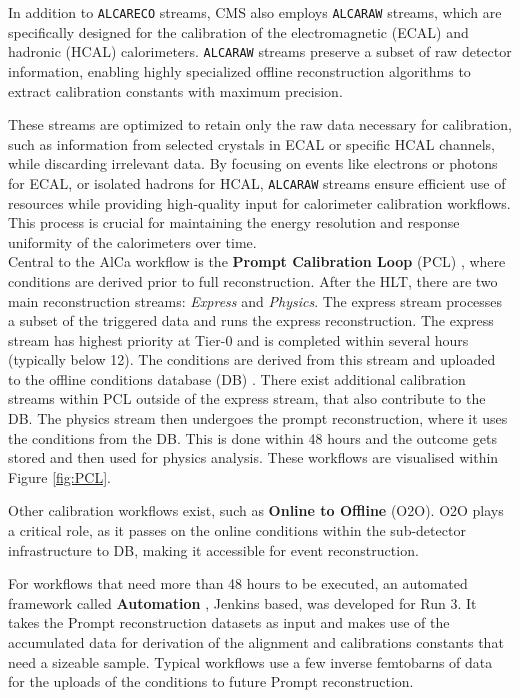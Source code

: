 In addition to \texttt{ALCARECO} streams, CMS also employs \texttt{ALCARAW} streams, which are specifically designed for the calibration of the electromagnetic (ECAL) and hadronic (HCAL) calorimeters. \texttt{ALCARAW} streams preserve a subset of raw detector information, enabling highly specialized offline reconstruction algorithms to extract calibration constants with maximum precision.

These streams are optimized to retain only the raw data necessary for calibration, such as information from selected crystals in ECAL or specific HCAL channels, while discarding irrelevant data. By focusing on events like electrons or photons for ECAL, or isolated hadrons for HCAL, \texttt{ALCARAW} streams ensure efficient use of resources while providing high-quality input for calorimeter calibration workflows. This process is crucial for maintaining the energy resolution and response uniformity of the calorimeters over time.\\

Central to the AlCa workflow is the \textbf{Prompt Calibration Loop} (PCL) \cite{David_Futyan_2010,Cerminara_2015}, where conditions are derived prior to full reconstruction. After the HLT, there are two main reconstruction streams: \textit{Express} and \textit{Physics}. The express stream processes a subset of the triggered data and runs the express reconstruction. The express stream has highest priority at Tier-0 and is completed within several hours (typically below 12). The conditions are derived from this stream and uploaded to the offline conditions database (DB) \cite{di2015cms}. There exist additional calibration streams within PCL outside of the express stream, that also contribute to the DB.
The physics stream then undergoes the prompt reconstruction, where it uses the conditions from the DB. This is done within 48 hours and the outcome gets stored and then used for physics analysis. These workflows are visualised within Figure \ref{fig:PCL}. 

Other calibration workflows exist, such as \textbf{Online to Offline} (O2O). O2O plays a critical role, as it passes on the online conditions within the sub-detector infrastructure to DB, making it accessible for event reconstruction.

For workflows that need more than 48 hours to be executed, an automated framework called \textbf{Automation} \cite{Pigazzini:2853679}, Jenkins based, was developed for Run 3. It takes the Prompt reconstruction datasets as input and makes use of the accumulated data for derivation of the alignment and calibrations constants that need a sizeable sample. Typical workflows use a few inverse femtobarns of data for the uploads of the conditions to future Prompt reconstruction.  

